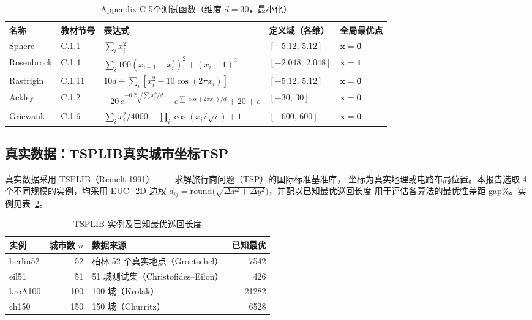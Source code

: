 \documentclass[12pt,a4paper,fontset=windows]{ctexart}
\begin{document}
\begin{table}[H]
  \centering
  \caption{Appendix C 5个测试函数（维度 $d=30$，最小化）}
  \label{tab:func}
  \small
  \setlength{\tabcolsep}{4pt}
  \begin{tabular}{lllll}
    \toprule
    名称 & 教材节号 & 表达式 & 定义域（各维） & 全局最优点 \\
    \midrule
    Sphere     & C.1.1  & $\sum_i x_i^2$                                                                  & $[-5.12,\,5.12]$   & $\bm{x}=\bm{0}$ \\
    Rosenbrock & C.1.4  & $\sum_i 100(x_{i+1}\!-\!x_i^2)^2+(x_i\!-\!1)^2$                                & $[-2.048,\,2.048]$ & $\bm{x}=\bm{1}$ \\
    Rastrigin  & C.1.11 & $10d+\sum_i[x_i^2-10\cos(2\pi x_i)]$                                            & $[-5.12,\,5.12]$   & $\bm{x}=\bm{0}$ \\
    Ackley     & C.1.2  & $-20\,e^{-0.2\sqrt{\sum x_i^2/d}} - e^{\sum\cos(2\pi x_i)/d} + 20 + e$         & $[-30,\,30]$       & $\bm{x}=\bm{0}$ \\
    Griewank   & C.1.6  & $\sum_i x_i^2/4000 - \prod_i\cos(x_i/\sqrt{i}) + 1$                            & $[-600,\,600]$     & $\bm{x}=\bm{0}$ \\
    \bottomrule
  \end{tabular}
\end{table}

\subsection{真实数据：TSPLIB真实城市坐标TSP}

真实数据采用 TSPLIB（Reinelt 1991）—— 求解旅行商问题（TSP）的国际标准基准库，
坐标为真实地理或电路布局位置。本报告选取 4 个不同规模的实例，均采用 EUC\_2D 边权
$d_{ij}=\mathrm{round}\!\big(\!\sqrt{\Delta x^2+\Delta y^2}\big)$，并配以已知最优巡回长度
用于评估各算法的最优性差距 gap\%。实例见表~\ref{tab:tsp}。

\begin{table}[H]
  \centering
  \caption{TSPLIB 实例及已知最优巡回长度}
  \label{tab:tsp}
  \small
  \begin{tabular}{lrlr}
    \toprule
    实例 & 城市数 $n$ & 数据来源 & 已知最优 \\
    \midrule
    berlin52 & 52  & 柏林 52 个真实地点（Groetschel）   & 7542  \\
    eil51    & 51  & 51 城测试集（Christofides--Eilon）  & 426   \\
    kroA100  & 100 & 100 城（Krolak）                    & 21282 \\
    ch150    & 150 & 150 城（Churritz）                  & 6528  \\
    \bottomrule
  \end{tabular}
\end{table}
\end{document}
